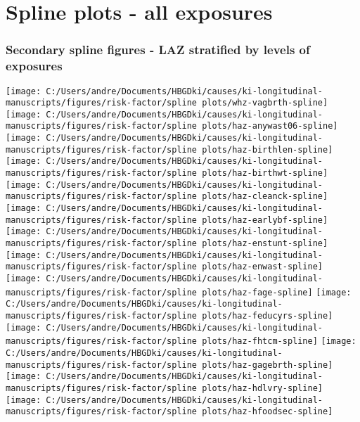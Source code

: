 \documentclass[9pt,]{book}
\begin{document}
\chapter{Spline plots - all exposures}\label{rf_splines}

\raggedright

\subsection{Secondary spline figures - LAZ stratified by levels of
exposures}\label{secondary-spline-figures---laz-stratified-by-levels-of-exposures}

\texttt{[image: C:/Users/andre/Documents/HBGDki/causes/ki-longitudinal-manuscripts/figures/risk-factor/spline plots/whz-vagbrth-spline]}
\texttt{[image: C:/Users/andre/Documents/HBGDki/causes/ki-longitudinal-manuscripts/figures/risk-factor/spline plots/haz-anywast06-spline]}
\texttt{[image: C:/Users/andre/Documents/HBGDki/causes/ki-longitudinal-manuscripts/figures/risk-factor/spline plots/haz-birthlen-spline]}
\texttt{[image: C:/Users/andre/Documents/HBGDki/causes/ki-longitudinal-manuscripts/figures/risk-factor/spline plots/haz-birthwt-spline]}
\texttt{[image: C:/Users/andre/Documents/HBGDki/causes/ki-longitudinal-manuscripts/figures/risk-factor/spline plots/haz-cleanck-spline]}
\texttt{[image: C:/Users/andre/Documents/HBGDki/causes/ki-longitudinal-manuscripts/figures/risk-factor/spline plots/haz-earlybf-spline]}
\texttt{[image: C:/Users/andre/Documents/HBGDki/causes/ki-longitudinal-manuscripts/figures/risk-factor/spline plots/haz-enstunt-spline]}
\texttt{[image: C:/Users/andre/Documents/HBGDki/causes/ki-longitudinal-manuscripts/figures/risk-factor/spline plots/haz-enwast-spline]}
\texttt{[image: C:/Users/andre/Documents/HBGDki/causes/ki-longitudinal-manuscripts/figures/risk-factor/spline plots/haz-fage-spline]}
\texttt{[image: C:/Users/andre/Documents/HBGDki/causes/ki-longitudinal-manuscripts/figures/risk-factor/spline plots/haz-feducyrs-spline]}
\texttt{[image: C:/Users/andre/Documents/HBGDki/causes/ki-longitudinal-manuscripts/figures/risk-factor/spline plots/haz-fhtcm-spline]}
\texttt{[image: C:/Users/andre/Documents/HBGDki/causes/ki-longitudinal-manuscripts/figures/risk-factor/spline plots/haz-gagebrth-spline]}
\texttt{[image: C:/Users/andre/Documents/HBGDki/causes/ki-longitudinal-manuscripts/figures/risk-factor/spline plots/haz-hdlvry-spline]}
\texttt{[image: C:/Users/andre/Documents/HBGDki/causes/ki-longitudinal-manuscripts/figures/risk-factor/spline plots/haz-hfoodsec-spline]}
\end{document}
